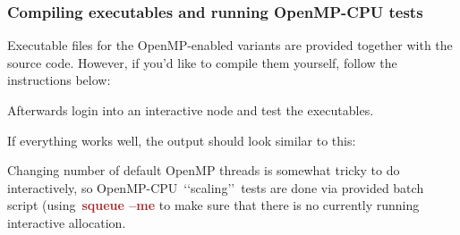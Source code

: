 
	




\subsubsection{Compiling executables and running OpenMP-CPU tests}


\par
Executable files for the OpenMP-enabled variants are provided together with the source code. However, if you’d like to compile them yourself, follow the instructions below:


Afterwards login into an interactive node and test the executables.


If everything works well, the output should look similar to this:



\par
Changing number of default OpenMP threads is somewhat tricky to do interactively, so OpenMP-CPU~\lq\lq scaling\rq\rq~tests are done via provided batch script (using~\textbf{\textcolor{brown}{squeue --me}} to make sure that there is no currently running interactive allocation.


